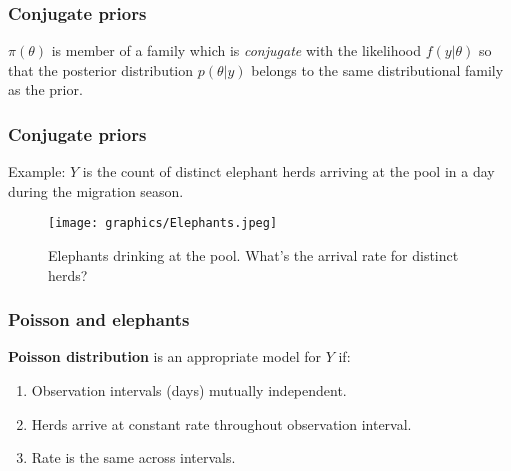 \documentclass{beamer}
\newcommand{\1}{\ensuremath{\mathbf{1}}}
\begin{document}
%
%
%
\begin{frame}\frametitle{Conjugate priors}
	\begin{block}{}
		$\pi(\theta)$ is member of a family which is \emph{conjugate} with the likelihood $f(y|\theta)$ so that the posterior distribution $p(\theta|y)$ belongs to the same distributional family as the prior.
	\end{block}
\end{frame}
%
%
%
\begin{frame}\frametitle{Conjugate priors}
	Example: $Y$ is the count of distinct elephant herds arriving at the pool in a day during the migration season.
	\begin{figure}
	\begin{center}
		\texttt{[image: graphics/Elephants.jpeg]}
	\end{center}
	\caption{Elephants drinking at the pool. What’s the arrival rate for distinct herds?}
	\end{figure}
\end{frame}
%
%
%
\begin{frame}\frametitle{Poisson and elephants}
	\textbf{Poisson distribution} is an appropriate model for $Y$ if:
	\begin{enumerate}
		\item Observation intervals (days) mutually independent.
		\item Herds arrive at constant rate throughout observation interval.
		\item Rate is the same across intervals. 
	\end{enumerate}
\end{frame}
\end{document}
